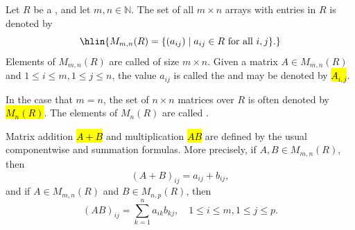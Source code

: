 \begin{definition}  \label{definition:matrix_over_a_ring}
    Let $R$ be a , and let $m,n \in \mathbb{N}$. The set of all $m \times n$ arrays with entries in $R$ is denoted by
    $$ \hlin{M_{m,n}(R) = \{ (a_{ij}) \mid a_{ij} \in R \text{ for all } i,j \}.}$$
    Elements of $M_{m,n}(R)$ are called  of size $m \times n$. Given a matrix $A \in M_{m,n}(R)$ and $1 \leq i \leq m, 1 \leq j \leq n$, the value $a_{ij}$ is called the  and may be denoted by \hl{$A_{i,j}$}.

    In the case that $m = n$, the set of $n \times n$ matrices over $R$ is often denoted by \hl{$M_n(R)$}. The elements of $M_n(R)$ are called .

    Matrix addition \hl{$A+B$} and multiplication \hl{$AB$} are defined by the usual componentwise and summation formulas. More precisely, if $A,B \in M_{m,n}(R)$, then 
    $$ (A+B)_{ij} = a_{ij} + b_{ij},$$ 
    and if $A \in M_{m,n}(R)$ and $B \in M_{n,p}(R)$, then
    $$ (AB)_{ij} = \sum_{k=1}^n a_{ik}b_{kj}, \quad 1 \leq i \leq m, 1 \leq j \leq p.$$
\end{definition}